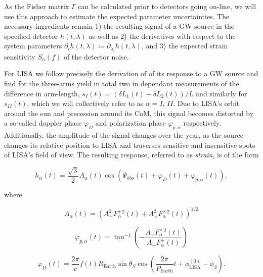\documentclass{aa}
\begin{document}
As the Fisher matrix $\Gamma$ can be calculated prior to detectors going on-line, we will use this approach to estimate the expected parameter uncertainties. The necessary ingredients remain 1) the resulting signal of a GW source in the specified detector $h(t,\lambda)$ as well as 2) the derivatives with respect to the system parameters $\partial_i h(t,\lambda) \coloneqq \partial_{\lambda_i}h(t,\lambda)$, and 3) the expected strain sensitivity $S_n(f)$ of the detector noise.

For LISA we follow precisely the derivation of \citep{cutler} of its response to a GW source and find for the three-arms yield in total two in dependant measurements of the difference in arm-length, $s_I(t)=\left(\delta L_1(t)-\delta L_2(t) \right)/L$ and similarly for $s_{II}(t)$, which we will collectively refer to as $\alpha = I, \, II$. Due to LISA's orbit around the sun and precession around its CoM, this signal becomes distorted by a so-called doppler phase $\varphi_D$ and polarization phase $\varphi_{p,\alpha}$ respectively. Additionally, the amplitude of the signal changes over the year, as the source changes its relative position to LISA and traverses sensitive and insensitive spots of LISA's field of view. The resulting response, referred to as \textit{strain}, is of the form

\begin{equation}
\label{eq:ampphase}
    h_\alpha(t) = \frac{\sqrt{3}}{2} A_\alpha(t)\cos \left(\Psi_\mathrm{obs}(t)+ \varphi_D(t) + \varphi_{p,\alpha}(t)\right),
\end{equation} 



where

\begin{equation} \label{eq:ampphase1}
    A_\alpha(t)=\left( A_+^2F_\alpha^+^2(t) + A_\times^2F_\alpha^\times^2(t) \right)^{1/2}
\end{equation}    

\begin{equation} \label{eq:ampphase2}
    \varphi_{p,\alpha}(t)=\tan^{-1} \left( -\frac{A_\times F_\alpha^\times^2(t)}{A_+F_\alpha^+(t)} \right)
\end{equation}    

\begin{equation} \label{eq:endampphase}
    \varphi_D(t) = \frac{2\pi}{c}f(t)R_\mathrm{Earth}\sin \theta_S \cos \left( \frac{2\pi}{P_\mathrm{Earth}}t + \phi_{\mathrm{LISA}}^{(0)} - \phi_S \right).
\end{equation}    
\end{document}
